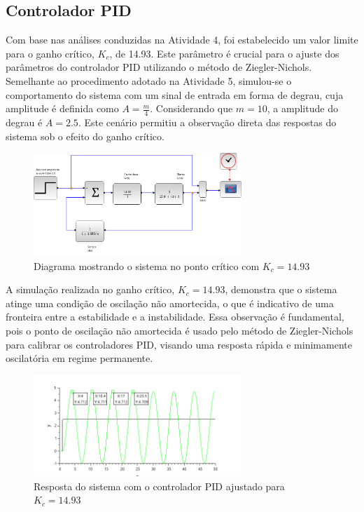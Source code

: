 \subsection{Controlador PID}

Com base nas análises conduzidas na Atividade 4, foi estabelecido um valor limite para o ganho crítico, \( K_c \), de 14.93. Este parâmetro é crucial para o ajuste dos parâmetros do controlador PID utilizando o método de Ziegler-Nichols. Semelhante ao procedimento adotado na Atividade 5, simulou-se o comportamento do sistema com um sinal de entrada em forma de degrau, cuja amplitude é definida como \( A = \frac{m}{4} \). Considerando que \( m = 10 \), a amplitude do degrau é \( A = 2.5 \). Este cenário permitiu a observação direta das respostas do sistema sob o efeito do ganho crítico.

\begin{figure}[H]
    \centering
    \includegraphics[width=0.7\textwidth]{6-atividade/assets/a/diagrama-ganho-critico-sistema-instavel.png}
    \caption{Diagrama mostrando o sistema no ponto crítico com \( K_c = 14.93 \)}
    \label{fig:diagrama-ponto-critico}
\end{figure}

A simulação realizada no ganho crítico, \( K_c = 14.93 \), demonstra que o sistema atinge uma condição de oscilação não amortecida, o que é indicativo de uma fronteira entre a estabilidade e a instabilidade. Essa observação é fundamental, pois o ponto de oscilação não amortecida é usado pelo método de Ziegler-Nichols para calibrar os controladores PID, visando uma resposta rápida e minimamente oscilatória em regime permanente.

\begin{figure}[H]
    \centering
    \includegraphics[width=0.7\textwidth]{6-atividade/assets/a/ganho-critico-sistema-instavel.png}
    \caption{Resposta do sistema com o controlador PID ajustado para \( K_c = 14.93 \)}
    \label{fig:ganho-critico-sistema-instavel}
\end{figure}


